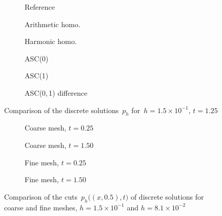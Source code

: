 \begin{figure}[h]
	\centering
	\begin{subfigure}{.3\linewidth}
		\centering
		\caption{Reference}
	\end{subfigure}%
	\hfill
	\begin{subfigure}{.3\linewidth}
		\centering
		\caption{Arithmetic homo.}	
	\end{subfigure}%
	\hfill
	\begin{subfigure}{.3\linewidth}
		\centering
		\caption{Harmonic homo.}	
	\end{subfigure}%
	\par
	\begin{subfigure}{.3\linewidth}
		\centering
		\caption{ASC(0)}
	\end{subfigure}%
	\hfill
	\begin{subfigure}{.3\linewidth}
		\centering
		\caption{ASC(1)}	
	\end{subfigure}%
	\hfill
	\begin{subfigure}{.3\linewidth}
		\centering
		\caption{ASC(0,\,1) difference}	
	\end{subfigure}%
	\caption{Comparison of the discrete solutions~$p_h$ for~$h = 1.5 \times 10^{-1}$, $t = 1.25$ \label{fig:transient:comp}}
 	\centering
 	\vskip 1cm
 	\begin{subfigure}{.45\linewidth}
 		\centering
 		\caption{Coarse mesh, $t = 0.25$}
 	\end{subfigure}%
 	\hfill
 	\begin{subfigure}{.45\linewidth}
 		\centering
 		\caption{Coarse mesh, $t = 1.50$}	
 	\end{subfigure}%
 	\par
 	\begin{subfigure}{.45\linewidth}
 		\centering
 		\caption{Fine mesh, $t = 0.25$}
 	\end{subfigure}%
 	\hfill
 	\begin{subfigure}{.45\linewidth}
 		\centering
		\caption{Fine mesh, $t = 1.50$}	
	\end{subfigure}%
	\caption{Comparison of the cuts~$p_h\big((x,0.5), t\big)$ of discrete solutions for coarse and fine meshes, $h = 1.5 \times 10^{-1}$ and $h = 8.1 \times 10^{-2}$ 		\label{fig:transient:cuts}}
\end{figure}

